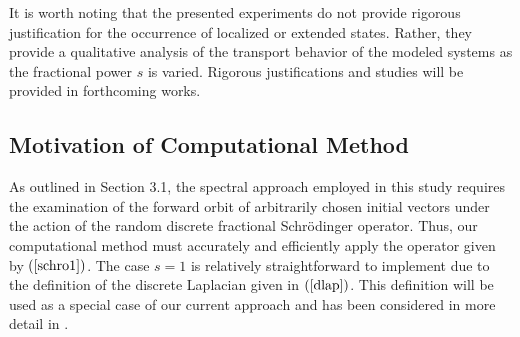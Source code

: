 \documentclass[final,1p,times]{elsarticle}
\def\R#1{$(\ref{#1})$}
\theoremstyle{remark}
\theoremstyle{definition}
\newcommand{\josh}[1]{\textcolor{red}{\textbf{#1}}}
\begin{document}
It is worth noting that the presented experiments do not provide rigorous justification for the occurrence of localized or extended states. Rather, they provide a qualitative analysis of the transport behavior of the modeled systems as the fractional power $s$ is varied.
Rigorous justifications and studies will be provided in forthcoming works. 

\subsection{Motivation of Computational Method}



As outlined in Section 3.1, the spectral approach employed in this study requires the examination of the forward orbit of arbitrarily chosen initial vectors under the action of the random discrete fractional Schr{\"o}dinger operator. Thus, our computational method must accurately and efficiently apply the operator given by \R{schro1}. The case $s=1$ is relatively straightforward to implement due to the definition of the discrete Laplacian given in \R{dlap}. This definition will be used as a special case of our current approach and has been considered in more detail in \cite{Liaw2013,PhysRevB.96.235408,kostadinova2018transport}. 
\end{document}
